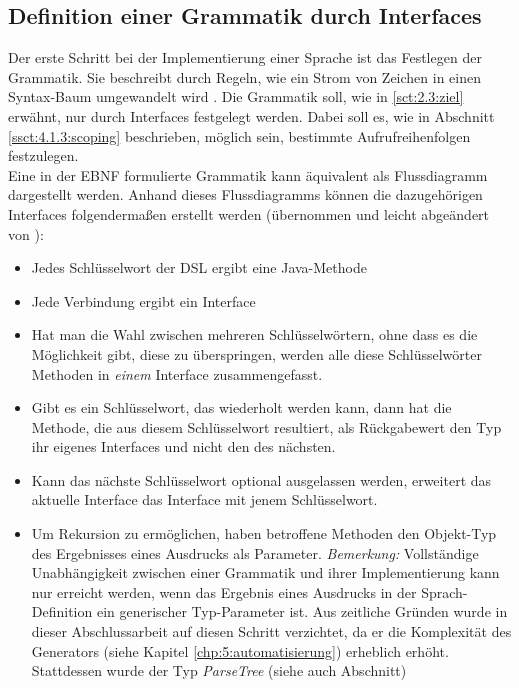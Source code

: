 \subsection{Definition einer Grammatik durch Interfaces}\label{ssct:4.3.1:grammatik}
Der erste Schritt bei der Implementierung einer Sprache ist das Festlegen der Grammatik. Sie beschreibt durch Regeln, wie ein Strom von Zeichen in einen Syntax-Baum umgewandelt wird \cite{book:fowlerDSL}. Die Grammatik soll, wie in \ref{sct:2.3:ziel} erwähnt, nur durch Interfaces festgelegt werden. Dabei soll es, wie in Abschnitt \ref{ssct:4.1.3:scoping} beschrieben, möglich sein, bestimmte Aufrufreihenfolgen festzulegen.\\ Eine in der EBNF formulierte Grammatik kann äquivalent als Flussdiagramm dargestellt werden. Anhand dieses Flussdiagramms können die dazugehörigen Interfaces folgendermaßen erstellt werden (übernommen und leicht abgeändert von \cite{www:jooq:fluentAPI}):

\begin{itemize}
	\item Jedes Schlüsselwort der DSL ergibt eine Java-Methode
	\item Jede Verbindung ergibt ein Interface
	\item Hat man die Wahl zwischen mehreren Schlüsselwörtern, ohne dass es die Möglichkeit gibt, diese zu überspringen, werden alle diese Schlüsselwörter Methoden in \emph{einem} Interface zusammengefasst.
	\item Gibt es ein Schlüsselwort, das wiederholt werden kann, dann hat die Methode, die aus diesem Schlüsselwort resultiert, als Rückgabewert den Typ ihr eigenes Interfaces und nicht den des nächsten.
	\item Kann das nächste Schlüsselwort optional ausgelassen werden, erweitert das aktuelle Interface das Interface mit jenem Schlüsselwort.
	\item Um Rekursion zu ermöglichen, haben betroffene Methoden den Objekt-Typ des Ergebnisses eines Ausdrucks als Parameter. \emph{Bemerkung:} Vollständige Unabhängigkeit zwischen einer Grammatik und ihrer Implementierung kann nur erreicht werden, wenn das Ergebnis eines Ausdrucks in der Sprach-Definition ein generischer Typ-Parameter ist. Aus zeitliche Gründen wurde in dieser Abschlussarbeit auf diesen Schritt verzichtet, da er die Komplexität des Generators (siehe Kapitel \ref{chp:5:automatisierung}) erheblich erhöht. Stattdessen wurde der Typ \emph{ParseTree} (siehe auch Abschnitt)
\end{itemize}

